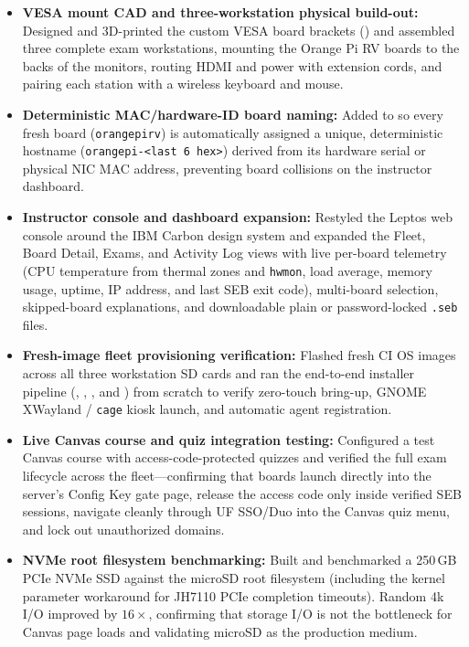 \documentclass[11pt]{article}
\begin{document}
\begin{itemize}
  \item \textbf{VESA mount CAD and three-workstation physical build-out:} Designed and 3D-printed the custom VESA board brackets () and assembled three complete exam workstations, mounting the Orange Pi RV boards to the backs of the monitors, routing HDMI and power with extension cords, and pairing each station with a wireless keyboard and mouse.
  \item \textbf{Deterministic MAC/hardware-ID board naming:} Added  to  so every fresh board (\texttt{orangepirv}) is automatically assigned a unique, deterministic hostname (\texttt{orangepi-<last 6 hex>}) derived from its hardware serial or physical NIC MAC address, preventing board collisions on the instructor dashboard.
  \item \textbf{Instructor console and dashboard expansion:} Restyled the Leptos web console around the IBM Carbon design system and expanded the Fleet, Board Detail, Exams, and Activity Log views with live per-board telemetry (CPU temperature from thermal zones and \texttt{hwmon}, load average, memory usage, uptime, IP address, and last SEB exit code), multi-board selection, skipped-board explanations, and downloadable plain or password-locked \texttt{.seb} files.
  \item \textbf{Fresh-image fleet provisioning verification:} Flashed fresh CI OS images across all three workstation SD cards and ran the end-to-end installer pipeline (, , , and ) from scratch to verify zero-touch bring-up, GNOME XWayland / \texttt{cage} kiosk launch, and automatic agent registration.
  \item \textbf{Live Canvas course and quiz integration testing:} Configured a test Canvas course with access-code-protected quizzes and verified the full exam lifecycle across the fleet---confirming that boards launch directly into the server's Config Key gate page, release the access code only inside verified SEB sessions, navigate cleanly through UF SSO/Duo into the Canvas quiz menu, and lock out unauthorized domains.
  \item \textbf{NVMe root filesystem benchmarking:} Built  and benchmarked a 250\,GB PCIe NVMe SSD against the microSD root filesystem (including the  kernel parameter workaround for JH7110 PCIe completion timeouts). Random 4k I/O improved by $16\times$, confirming that storage I/O is not the bottleneck for Canvas page loads and validating microSD as the production medium.
\end{itemize}
\end{document}
